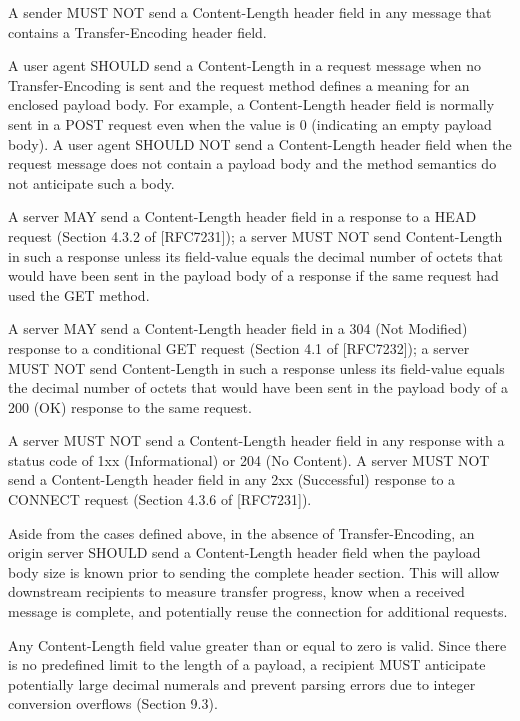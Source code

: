    A sender MUST NOT send a Content-Length header field in any message
   that contains a Transfer-Encoding header field.

   A user agent SHOULD send a Content-Length in a request message when
   no Transfer-Encoding is sent and the request method defines a meaning
   for an enclosed payload body.  For example, a Content-Length header
   field is normally sent in a POST request even when the value is 0
   (indicating an empty payload body).  A user agent SHOULD NOT send a
   Content-Length header field when the request message does not contain
   a payload body and the method semantics do not anticipate such a
   body.

   A server MAY send a Content-Length header field in a response to a
   HEAD request (Section 4.3.2 of [RFC7231]); a server MUST NOT send
   Content-Length in such a response unless its field-value equals the
   decimal number of octets that would have been sent in the payload
   body of a response if the same request had used the GET method.

   A server MAY send a Content-Length header field in a 304 (Not
   Modified) response to a conditional GET request (Section 4.1 of
   [RFC7232]); a server MUST NOT send Content-Length in such a response
   unless its field-value equals the decimal number of octets that would
   have been sent in the payload body of a 200 (OK) response to the same
   request.

   A server MUST NOT send a Content-Length header field in any response
   with a status code of 1xx (Informational) or 204 (No Content).  A
   server MUST NOT send a Content-Length header field in any 2xx
   (Successful) response to a CONNECT request (Section 4.3.6 of
   [RFC7231]).

   Aside from the cases defined above, in the absence of
   Transfer-Encoding, an origin server SHOULD send a Content-Length
   header field when the payload body size is known prior to sending the
   complete header section.  This will allow downstream recipients to
   measure transfer progress, know when a received message is complete,
   and potentially reuse the connection for additional requests.

   Any Content-Length field value greater than or equal to zero is
   valid.  Since there is no predefined limit to the length of a
   payload, a recipient MUST anticipate potentially large decimal
   numerals and prevent parsing errors due to integer conversion
   overflows (Section 9.3).

